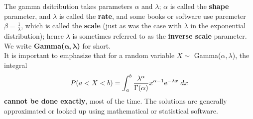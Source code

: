 \noindent The gamma dsitribution takes parameters $\alpha$ and $\lambda$; $\alpha$ is called the \textbf{shape} parameter, and $\lambda$ is called the \textbf{rate}, and some books or software use paremeter $\beta = \frac{1}{\lambda}$, which is called the \textbf{scale} (just as was the case with $\lambda$ in the exponential distribution); hence $\lambda$ is sometimes referred to as the \textbf{inverse scale} parameter. We write \textbf{Gamma($\boldsymbol{\alpha,\lambda}$)} for short. \label{inverse scale gamma} \label{shape gamma} \label{rate gamma} \\

\noindent It is important to emphasize that for a random variable $X \sim $ Gamma($\alpha,\lambda$), the integral
\[
P(a < X < b) = \int_a^b \frac{\lambda^\alpha}{\Gamma(\alpha)}x^{\alpha - 1}\mathrm{e}^{-\lambda x} \; dx 
\]
\textbf{cannot be done exactly}, most of the time. The solutions are generally approximated or looked up using mathematical or statistical software. \\

